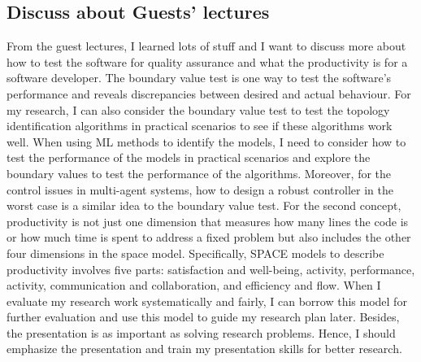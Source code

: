\documentclass[11pt]{article}
\begin{document}
\subsection*{Discuss about Guests' lectures}
From the guest lectures, I learned lots of stuff and I want to discuss more about how to test the software for quality assurance and what the productivity is for a software developer. The boundary value test is one way to test the software’s performance and reveals discrepancies between desired and actual behaviour. For my research, I can also consider the boundary value test to test the topology identification algorithms in practical scenarios to see if these algorithms work well. When using ML methods to identify the models, I need to consider how to test the performance of the models in practical scenarios and explore the boundary values to test the performance of the algorithms. Moreover, for the control issues in multi-agent systems, how to design a robust controller in the worst case is a similar idea to the boundary value test. For the second concept, productivity is not just one dimension that measures how many lines the code is or how much time is spent to address a fixed problem but also includes the other four dimensions in the space model. Specifically, SPACE models to describe productivity involves five parts:  satisfaction and well-being, activity, performance, activity, communication and collaboration, and efficiency and flow. When I evaluate my research work systematically and fairly, I can borrow this model for further evaluation and use this model to guide my research plan later. Besides, the presentation is as important as solving research problems. Hence, I should emphasize the presentation and train my presentation skills for better research.
\\
\end{document}
